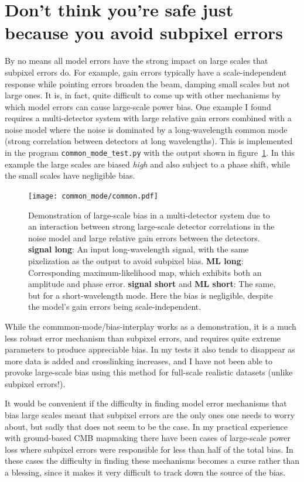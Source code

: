 \documentclass[twocolumn,apj]{aastex63}
\newcommand{\dfn}[1]{\textbf{#1}}
\begin{document}
\section{Don't think you're safe just because you avoid subpixel errors}
By no means all model errors have the strong impact on large scales
that subpixel errors do. For example, gain errors typically have a
scale-independent response while pointing errors broaden the beam, damping
small scales but not large ones. It is, in fact, quite difficult to come up
with other mechanisms by which model errors can cause large-scale power
bias. One example I found requires a multi-detector system with large relative
gain errors combined with a noise model where the noise is
dominated by a long-wavelength common mode (strong correlation between detectors
at long wavelengths). This is implemented in the program \verb|common_mode_test.py|
with the output shown in figure~\ref{fig:common}. In this example the
large scales are biased \emph{high} and also subject to a phase shift, while
the small scales have negligible bias.

\begin{figure}
	\centering
	\texttt{[image: common\_mode/common.pdf]}
	\caption{
		Demonstration of large-scale bias in a multi-detector system
		due to an interaction between strong large-scale
		detector correlations in the noise model and large
		relative gain errors between the detectors.
		\dfn{signal long}: An input long-wavelength signal,
		with the same pixelization as the output to avoid subpixel bias.
		\dfn{ML long}: Corresponding maximum-likelihood map, which
		exhibits both an amplitude and phase error.
		\dfn{signal short} and \dfn{ML short}: The same, but for a
		short-wavelength mode. Here the bias is negligible,
		despite the model's gain errors being scale-independent.
	}
	\label{fig:common}
\end{figure}

While the commmon-mode/bias-interplay works as a demonstration, it is a much
less robust error mechanism than subpixel errors, and requires quite extreme
parameters to produce appreciable bias. In my tests it also tends to disappear
as more data is added and crosslinking increases, and I have not been able to
provoke large-scale bias using this method for full-scale realistic datasets
(unlike subpixel errors!).

It would be convenient if the difficulty in finding model error mechanisms that
bias large scales meant that subpixel errors are the only ones one needs to
worry about, but sadly that does not seem to be the case. In my practical
experience with ground-based CMB mapmaking there have been cases of large-scale
power loss where subpixel errors were responsible for less than half of the
total bias. In these cases the difficulty in finding these mechanisms becomes
a curse rather than a blessing, since it makes it very difficult to track down
the source of the bias.
\end{document}
